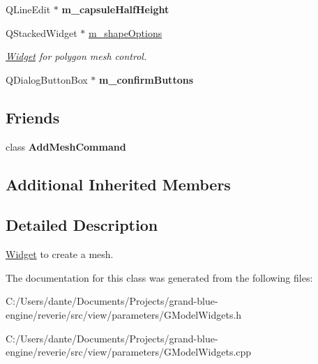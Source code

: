 \begin{Indent}
\begin{DoxyCompactItemize}
Q\+Line\+Edit $\ast$ {\bfseries m\+\_\+capsule\+Half\+Height}
\item 
\mbox{\label{classrev_1_1_view_1_1_create_mesh_widget_a2584f874a8780900c4ebc482b5335183}} 
Q\+Stacked\+Widget $\ast$ \mbox{\hyperlink{classrev_1_1_view_1_1_create_mesh_widget_a2584f874a8780900c4ebc482b5335183}{m\+\_\+shape\+Options}}
\begin{DoxyCompactList}\small\item\em \mbox{\hyperlink{class_widget}{Widget}} for polygon mesh control. \end{DoxyCompactList}\item 
\mbox{\label{classrev_1_1_view_1_1_create_mesh_widget_af4d64c4642a388e428c7263fc6c1694c}} 
Q\+Dialog\+Button\+Box $\ast$ {\bfseries m\+\_\+confirm\+Buttons}
\end{DoxyCompactItemize}
\end{Indent}
\subsection*{Friends}
\begin{DoxyCompactItemize}
\item 
\mbox{\label{classrev_1_1_view_1_1_create_mesh_widget_adbbac24962e91f556b29b03a98f822ae}} 
class {\bfseries Add\+Mesh\+Command}
\end{DoxyCompactItemize}
\subsection*{Additional Inherited Members}


\subsection{Detailed Description}
\mbox{\hyperlink{class_widget}{Widget}} to create a mesh. 

The documentation for this class was generated from the following files\+:\begin{DoxyCompactItemize}
\item 
C\+:/\+Users/dante/\+Documents/\+Projects/grand-\/blue-\/engine/reverie/src/view/parameters/G\+Model\+Widgets.\+h\item 
C\+:/\+Users/dante/\+Documents/\+Projects/grand-\/blue-\/engine/reverie/src/view/parameters/G\+Model\+Widgets.\+cpp\end{DoxyCompactItemize}
